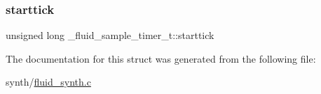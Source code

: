 \mbox{\label{struct__fluid__sample__timer__t_af750cdf98b310863bfb66f7595ec6129}} 
\subsubsection{\texorpdfstring{starttick}{starttick}}
{\footnotesize\ttfamily unsigned long \+\_\+fluid\+\_\+sample\+\_\+timer\+\_\+t\+::starttick}



The documentation for this struct was generated from the following file\+:\begin{DoxyCompactItemize}
\item 
synth/\hyperlink{fluid__synth_8c}{fluid\+\_\+synth.\+c}\end{DoxyCompactItemize}
